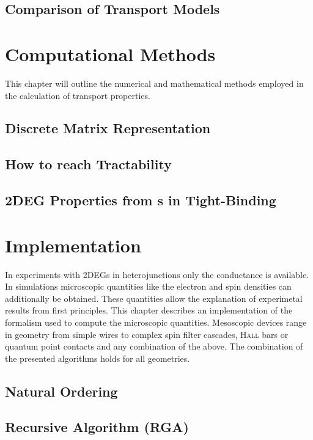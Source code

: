   \section{Comparison of Transport Models}
  
\chapter{Computational Methods}
This chapter will outline the numerical and mathematical methods employed in the calculation of transport properties.
  \section{Discrete Matrix Representation}\label{sec:discretematrixrep}
  
  \section{How to reach Tractability}\label{sec:tractability}
  
  \section{2DEG Properties from \cgfnc s in Tight-Binding}\label{sec:observables}
  
\chapter{Implementation}
In experiments with 2DEGs in heterojunctions only the conductance is available. In simulations microscopic quantities like the electron and spin densities can additionally be obtained. These quantities allow the explanation of experimetal results from first principles. This chapter describes an implementation of the \gfnc{} formalism used to compute the microscopic quantities.
Mesoscopic devices range in geometry from simple wires to complex spin filter cascades, \textsc{Hall} bars or quantum point contacts and any combination of the above. The combination of the presented algorithms holds for all geometries.
\section{Natural Ordering}\label{sec:naruralordering}

\section{Recursive \cgfnc{} Algorithm (RGA)} \label{sec:recursivegreenfncalgorithm}

